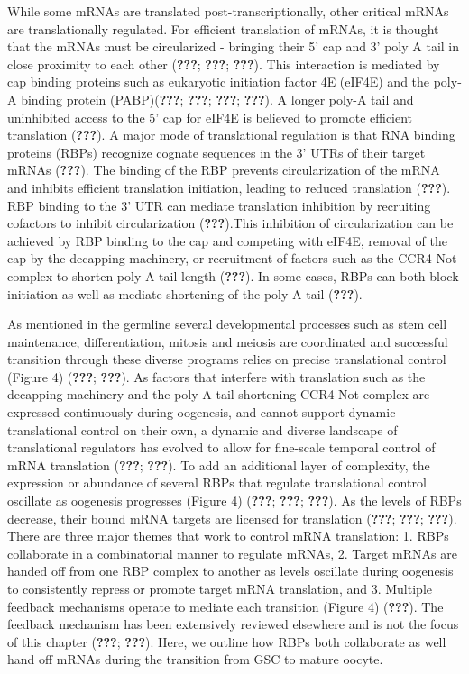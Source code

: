 \documentclass[12pt,oneside]{reedthesis}
\begin{document}
While some mRNAs are translated post-transcriptionally, other critical
mRNAs are translationally regulated. For efficient translation of mRNAs,
it is thought that the mRNAs must be circularized - bringing their 5'
cap and 3' poly A tail in close proximity to each other ({\textbf{???}}; {\textbf{???}}; {\textbf{???}}). This interaction is mediated by cap
binding proteins such as eukaryotic initiation factor 4E (eIF4E) and the
poly-A binding protein (PABP)({\textbf{???}}; {\textbf{???}}; {\textbf{???}}; {\textbf{???}}). A longer poly-A tail and uninhibited
access to the 5' cap for eIF4E is believed to promote efficient
translation ({\textbf{???}}). A major mode of translational
regulation is that RNA binding proteins (RBPs) recognize cognate
sequences in the 3' UTRs of their target mRNAs ({\textbf{???}}). The
binding of the RBP prevents circularization of the mRNA and inhibits
efficient translation initiation, leading to reduced translation
({\textbf{???}}). RBP binding to the 3' UTR can mediate translation
inhibition by recruiting cofactors to inhibit circularization
({\textbf{???}}).This inhibition of circularization can be achieved by
RBP binding to the cap and competing with eIF4E, removal of the cap by
the decapping machinery, or recruitment of factors such as the CCR4-Not
complex to shorten poly-A tail length ({\textbf{???}}). In some
cases, RBPs can both block initiation as well as mediate shortening of
the poly-A tail ({\textbf{???}}).

As mentioned in the germline several developmental processes such as
stem cell maintenance, differentiation, mitosis and meiosis are
coordinated and successful transition through these diverse programs
relies on precise translational control (Figure 4) ({\textbf{???}}; {\textbf{???}}). As factors that interfere with translation such as
the decapping machinery and the poly-A tail shortening CCR4-Not complex
are expressed continuously during oogenesis, and cannot support dynamic
translational control on their own, a dynamic and diverse landscape of
translational regulators has evolved to allow for fine-scale temporal
control of mRNA translation ({\textbf{???}}; {\textbf{???}}). To add an
additional layer of complexity, the expression or abundance of several
RBPs that regulate translational control oscillate as oogenesis
progresses (Figure 4) ({\textbf{???}}; {\textbf{???}}; {\textbf{???}}). As
the levels of RBPs decrease, their bound mRNA targets are licensed for
translation ({\textbf{???}}; {\textbf{???}}; {\textbf{???}}). There are three
major themes that work to control mRNA translation: 1. RBPs collaborate
in a combinatorial manner to regulate mRNAs, 2. Target mRNAs are handed
off from one RBP complex to another as levels oscillate during oogenesis
to consistently repress or promote target mRNA translation, and 3.
Multiple feedback mechanisms operate to mediate each transition (Figure
4) ({\textbf{???}}). The feedback mechanism has been extensively
reviewed elsewhere and is not the focus of this chapter ({\textbf{???}}; {\textbf{???}}). Here, we outline how RBPs both collaborate as well
hand off mRNAs during the transition from GSC to mature oocyte.
\end{document}
